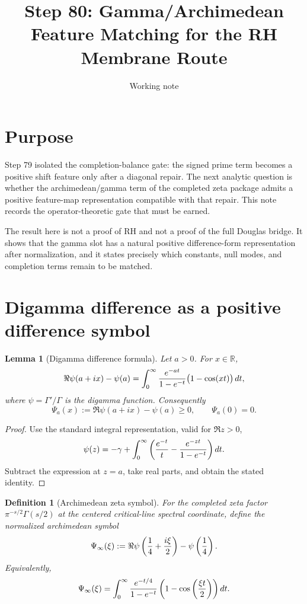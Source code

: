 \documentclass[11pt]{article}
\title{Step 80: Gamma/Archimedean Feature Matching for the RH Membrane Route}
\author{Working note}
\date{}
\newtheorem{lemma}{Lemma}
\newtheorem{definition}{Definition}
\newcommand{\R}{\mathbb R}
\begin{document}
\maketitle

\section{Purpose}
Step 79 isolated the completion-balance gate: the signed prime term becomes a positive shift feature only after a diagonal repair. The next analytic question is whether the archimedean/gamma term of the completed zeta package admits a positive feature-map representation compatible with that repair. This note records the operator-theoretic gate that must be earned.

The result here is not a proof of RH and not a proof of the full Douglas bridge. It shows that the gamma slot has a natural positive difference-form representation after normalization, and it states precisely which constants, null modes, and completion terms remain to be matched.

\section{Digamma difference as a positive difference symbol}

\begin{lemma}[Digamma difference formula]
Let $a>0$. For $x\in\R$,
\begin{equation}
\Re\psi(a+ix)-\psi(a)
=\int_0^\infty {e^{-at}\over 1-e^{-t}}\bigl(1-\cos(xt)\bigr)\,dt,
\end{equation}
where $\psi=\Gamma'/\Gamma$ is the digamma function.
Consequently
\begin{equation}
\Psi_a(x):=\Re\psi(a+ix)-\psi(a)\ge0,
\qquad
\Psi_a(0)=0.
\end{equation}
\end{lemma}

\begin{proof}
Use the standard integral representation, valid for $\Re z>0$,
\begin{equation}
\psi(z)=-\gamma+\int_0^\infty\left({e^{-t}\over t}-{e^{-zt}\over 1-e^{-t}}\right)dt.
\end{equation}
Subtract the expression at $z=a$, take real parts, and obtain the stated identity.
\end{proof}

\begin{definition}[Archimedean zeta symbol]
For the completed zeta factor $\pi^{-s/2}\Gamma(s/2)$ at the centered critical-line spectral coordinate, define the normalized archimedean symbol
\begin{equation}
\Psi_\infty(\xi)
:=\Re\psi\left({1\over4}+{i\xi\over2}\right)-\psi\left({1\over4}\right).
\end{equation}
Equivalently,
\begin{equation}
\Psi_\infty(\xi)
=\int_0^\infty {e^{-t/4}\over 1-e^{-t}}\left(1-\cos\left({\xi t\over2}\right)\right)dt.
\end{equation}
\end{definition}
\end{document}
